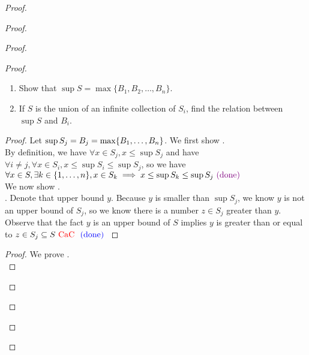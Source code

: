 \documentclass{report}
\begin{document}
\begin{proof}
\begin{proof}
\begin{proof}
\begin{proof}
\begin{question}{}{}
\begin{enumerate}
    \item Show that \(\sup S = \max\{B_1, B_2, \ldots, B_n\} \).
    \item If \(S\) is the union of an infinite collection of \(S_i\), find the relation between \(\sup S\) and \(B_i\).
\end{enumerate}
\end{question}
\begin{proof}
Let $\sup S_j=B_j=\max \{ B_1,\dots, B_n \}$. We first show .\\

By definition, we have $\forall x\in S_j,x\leq \sup S_j$ and have $\forall i \neq j, \forall x \in S_i, x\leq \sup S_i\leq \sup S_j $, so we have $\forall x\in S, \exists k \in \{ 1,\dots, n \}, x \in S_k \implies x\leq \sup S_k\leq \sup S_j\textcolor{violet}{\text{ (done) }}$\\

We now show  .\\

. Denote that upper bound $y$. Because $y$ is smaller than $\sup S_j$, we know $y$ is not an upper bound of $S_j$, so we know there is a number  $z \in S_j$ greater than $y$. Observe that the fact $y$ is an upper bound of $S$ implies  $y$ is greater than or equal to $z \in S_j\subseteq S\text{ \textcolor{red}{CaC} }\textcolor{blue}{\text{ (done) }}$
\end{proof}
\begin{proof}
  We prove .\\


\end{proof}
\end{proof}
\end{proof}
\end{proof}
\end{proof}
\end{document}

